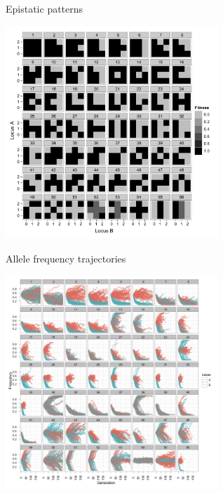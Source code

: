 \documentclass{beamer}
\begin{document}
\begin{frame}{Epistatic patterns}
\begin{center}
\includegraphics[width=8cm]{sup_gpmaps.pdf}
\end{center}
\end{frame}

\begin{frame}{Allele frequency trajectories}
\begin{center}
\includegraphics[width=8cm]{sup_allelefreq_sim.png}
\end{center}
\end{frame}
\end{document}
